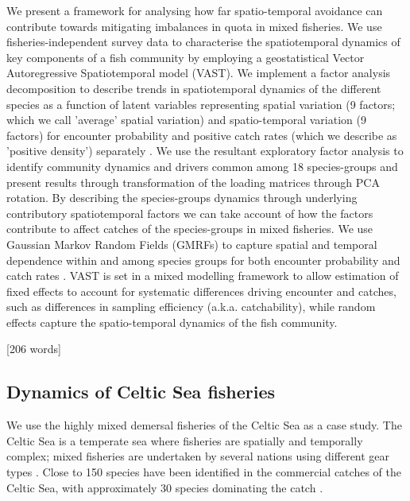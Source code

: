 \documentclass{nature}
\begin{document}
\begin{linenumbers}
We present a framework for analysing how far spatio-temporal avoidance can
contribute towards mitigating imbalances in quota in mixed fisheries. We use
fisheries-independent survey data to characterise the spatiotemporal dynamics
of key components of a fish community by employing a geostatistical Vector
Autoregressive Spatiotemporal model (VAST). We implement a factor analysis
decomposition to describe trends in spatiotemporal dynamics of the different
species as a function of latent variables \cite{Thorson2015} representing
spatial variation (9 factors; which we call 'average' spatial variation) and
spatio-temporal variation (9 factors) for encounter probability and positive
catch rates (which we describe as 'positive density') separately
\cite{Thorson2015a}. We use the resultant exploratory factor analysis to
identify community dynamics and drivers common among 18 species-groups and
present results through transformation of the loading matrices through PCA
rotation. By describing the species-groups dynamics through underlying
contributory spatiotemporal factors we can take account of how the factors
contribute to affect catches of the species-groups in mixed fisheries. We use
Gaussian Markov Random Fields (GMRFs) to capture spatial and temporal
dependence within and among species groups for both encounter probability and
catch rates \cite{Thorson2013}. VAST is set in a mixed modelling framework to
allow estimation of fixed effects to account for systematic differences driving
encounter and catches, such as differences in sampling efficiency (a.k.a.
catchability), while random effects capture the spatio-temporal dynamics of the
fish community.

[206 words]

\subsection{Dynamics of Celtic Sea fisheries}

We use the highly mixed demersal fisheries of the Celtic Sea as a case study.
The Celtic Sea is a temperate sea where fisheries are spatially and temporally
complex; mixed fisheries are undertaken by several nations using different gear
types \cite{Ellis2000, Gerritsen2012}. Close to 150 species have been
identified in the commercial catches of the Celtic Sea, with approximately 30
species dominating the catch \cite{Mateo2016}.


\end{linenumbers}
\end{document}
